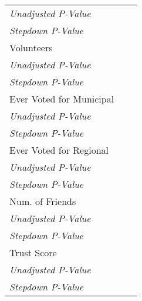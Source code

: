 \begin{tabular}{l c c}
\quad \textit{Unadjusted P-Value} \\
\quad \textit{Stepdown P-Value} \\
Volunteers \\
\quad \textit{Unadjusted P-Value} \\
\quad \textit{Stepdown P-Value} \\
Ever Voted for Municipal \\
\quad \textit{Unadjusted P-Value} \\
\quad \textit{Stepdown P-Value} \\
Ever Voted for Regional \\
\quad \textit{Unadjusted P-Value} \\
\quad \textit{Stepdown P-Value} \\
Num. of Friends \\
\quad \textit{Unadjusted P-Value} \\
\quad \textit{Stepdown P-Value} \\
Trust Score \\
\quad \textit{Unadjusted P-Value} \\
\quad \textit{Stepdown P-Value} \\
\bottomrule
\end{tabular}
